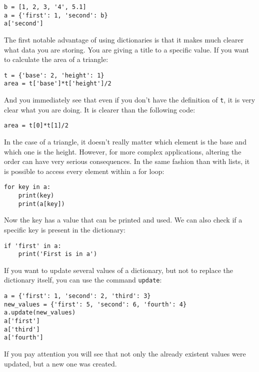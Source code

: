 \begin{verbatim}
b = [1, 2, 3, '4', 5.1]
a = {'first': 1, 'second': b}
a['second']
\end{verbatim}

The first notable advantage of using dictionaries is that it makes much
clearer what data you are storing. You are giving a title to a specific
value. If you want to calculate the area of a triangle:

\begin{verbatim}
t = {'base': 2, 'height': 1}
area = t['base']*t['height']/2
\end{verbatim}

And you immediately see that even if you don't have the definition of
\texttt{t}, it is very clear what you are doing. It is clearer than the
following code:

\begin{verbatim}
area = t[0]*t[1]/2
\end{verbatim}

In the case of a triangle, it doesn't really matter which element is the
base and which one is the height. However, for more complex
applications, altering the order can have very serious consequences. In
the same fashion than with lists, it is possible to access every element
within a for loop:

\begin{verbatim}
for key in a:
    print(key)
    print(a[key])
\end{verbatim}

Now the key has a value that can be printed and used. We can also check
if a specific key is present in the dictionary:

\begin{verbatim}
if 'first' in a:
    print('First is in a')
\end{verbatim}

If you want to update several values of a dictionary, but not to replace
the dictionary itself, you can use the command \texttt{update}:

\begin{verbatim}
a = {'first': 1, 'second': 2, 'third': 3}
new_values = {'first': 5, 'second': 6, 'fourth': 4}
a.update(new_values)
a['first']
a['third']
a['fourth']
\end{verbatim}

If you pay attention you will see that not only the already existent
values were updated, but a new one was created.

